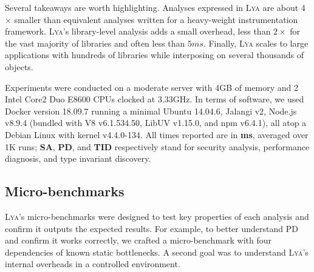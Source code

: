 \documentclass[letterpaper,twocolumn,10pt]{article}
\newcommand{\sys}{{\scshape Lya}\xspace}
\begin{document}
Several takeaways are worth highlighting.
Analyses expressed in \sys are about 4$\times$ smaller than equivalent analyses written for a heavy-weight instrumentation framework.
\sys's library-level analysis adds a small overhead, less than $2\times$ for the vast majority of libraries and often less than $5ms$.
Finally, \sys scales to large applications with hundreds of libraries while interposing on several thousands of objects.

Experiments were conducted on a moderate server with 4GB of memory and 2 Intel Core2 Duo E8600 CPUs clocked at 3.33GHz.
In terms of software, we used Docker version 18.09.7 running a minimal Ubuntu 14.04.6, Jalangi v2, Node.js v8.9.4 (bundled with V8 v6.1.534.50, LibUV v1.15.0, and npm v6.4.1), all atop a Debian Linux with kernel v4.4.0-134.
All times reported are in \textbf{ms}, averaged over 1K runs;
  \textbf{SA}, \textbf{PD}, and \textbf{TID} respectively stand for security analysis, performance diagnosis, and type invariant discovery.
  

\subsection{Micro-benchmarks}
\label{micro}

\sys's micro-benchmarks were designed to test key properties of each analysis and confirm it outputs the expected results.
For example, to better understand PD and confirm it works correctly, we crafted a micro-benchmark with four dependencies of known static bottlenecks.
A second goal was to understand \sys's internal overheads in a controlled environment.
\end{document}
